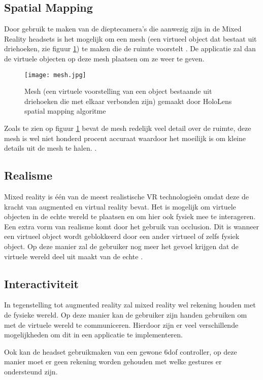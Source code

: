 
\subsection{Spatial Mapping}
Door gebruik te maken van de dieptecamera's die aanwezig zijn in de Mixed Reality headsets is het mogelijk om een mesh (een virtueel object dat bestaat uit driehoeken, zie figuur \ref{fig:mesh}) te maken die de ruimte voorstelt \autocite{Evans2017}. De applicatie zal dan de virtuele objecten op deze mesh plaatsen om ze weer te geven. 

\begin{figure}
    \texttt{[image: mesh.jpg]}
    \caption{Mesh (een virtuele voorstelling van een object bestaande uit driehoeken die met elkaar verbonden zijn) gemaakt door HoloLens spatial mapping algoritme}
    \label{fig:mesh}
\end{figure}

Zoals te zien op figuur \ref{fig:mesh} bevat de mesh redelijk veel detail over de ruimte, deze mesh is wel niet honderd procent accuraat waardoor het moeilijk is om kleine details uit de mesh te halen. \autocite{Evans2017}.

\subsection{Realisme}
Mixed reality is één van de meest realistische VR technologieën omdat deze de kracht van augmented en virtual reality bevat. Het is mogelijk om virtuele objecten in de echte wereld te plaatsen en om hier ook fysiek mee te interageren. Een extra vorm van realisme komt door het gebruik van occlusion. Dit is wanneer een virtueel object wordt geblokkeerd door een ander virtueel of zelfs fysiek object. Op deze manier zal de gebruiker nog meer het gevoel krijgen dat de virtuele wereld deel uit maakt van de echte \autocite{Evans2017}.

\subsection{Interactiviteit}
In tegenstelling tot augmented reality zal mixed reality wel rekening houden met de fysieke wereld. Op deze manier kan de gebruiker zijn handen gebruiken om met de virtuele wereld te communiceren. Hierdoor zijn er veel verschillende mogelijkheden om dit in een applicatie te implementeren.

Ook kan de headset gebruikmaken van een gewone \acrshort{6dof} controller, op deze manier moet er geen rekening worden gehouden met welke gestures er ondersteund zijn.

